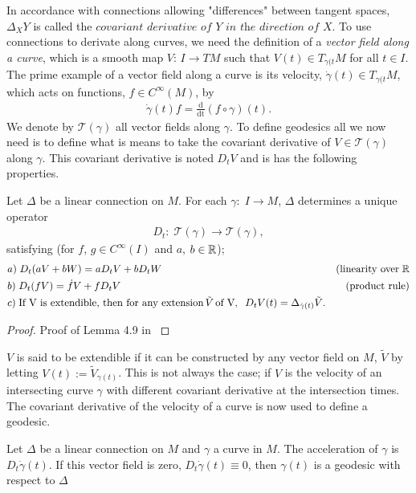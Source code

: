 In accordance with connections allowing "differences" between tangent spaces, $ \Delta_X Y $ is called the $\textit{covariant derivative of Y in the direction of X}$. To use connections to derivate along curves, we need the definition of a \textit{vector field along a curve}, which is a smooth map $V: \, I \rightarrow TM$ such that $V(t) \in T_{\gamma(t} M$ for all $t \in I$. The prime example of a vector field along a curve is its velocity, $\dot{\gamma}(t) \in T_{\gamma(t} M$, which acts on functions, $f \in C^\infty(M)$, by
\begin{align*}
\dot{\gamma}(t) f = \frac{\text{d}}{\text{dt}} (f \circ \gamma)(t).
\end{align*} 
We denote by $\mathcal{T}(\gamma)$ all vector fields along $\gamma$. 
To define geodesics all we now need is to define what is means to take the covariant derivative of $V \in \mathcal{T}(\gamma)$ along $\gamma$. This covariant derivative is noted $D_t V$ and is has the following properties.

\begin{lemma}
Let $\Delta$ be a linear connection on $M$. For each $\gamma: \; I \rightarrow M$, $\Delta$ determines a unique operator
\begin{align*}
D_t: \; \mathcal{T}(\gamma) \rightarrow \mathcal{T}(\gamma),
\end{align*} 
satisfying (for $f$, $g \in C^\infty(I)$ and $a$, $b \in \mathbb{R}$);
\begin{align*}
& a) \; D_t(aV + bW) = aD_tV + bD_tW \; \; \; \; & \text{(linearity over} \; \mathbb{R} \\
& b) \; D_t(fV) = \dot{f}V + fD_tV & \text{(product rule)} \\
& c) \; \text{If V is extendible, then for any extension} \, \tilde{V} \, \text{of V}, \; \; D_tV(t) = \Delta_{\dot{\gamma}(t)} \tilde{V}.
\end{align*}
\end{lemma}
\begin{proof}
Proof of Lemma 4.9 in \citet{RiemannLee}
\end{proof}

$V$ is said to be extendible if it can be constructed by any vector field on $M$, $\tilde{V}$ by letting $V(t) := \tilde{V}_{\gamma(t)}$. This is not always the case; if $V$ is the velocity of an intersecting curve $\gamma$ with different covariant derivative at the intersection times. The covariant derivative of the velocity of a curve is now used to define a geodesic.

\begin{definition}
Let $\Delta$ be a linear connection on $M$ and $\gamma$ a curve in $M$. The acceleration of $\gamma$ is $D_t \dot{\gamma}(t)$. If this vector field is zero, $D_t \dot{\gamma}(t) \equiv 0$, then $\gamma(t)$ is a geodesic with respect to $\Delta$
\end{definition}

